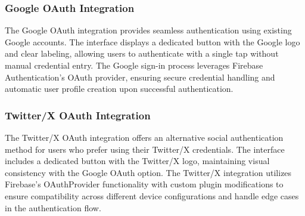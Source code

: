 \subsubsection{Google OAuth Integration}

The Google OAuth integration provides seamless authentication using existing Google accounts. The interface displays a dedicated button with the Google logo and clear labeling, allowing users to authenticate with a single tap without manual credential entry. The Google sign-in process leverages Firebase Authentication's OAuth provider, ensuring secure credential handling and automatic user profile creation upon successful authentication.

\subsubsection{Twitter/X OAuth Integration}

The Twitter/X OAuth integration offers an alternative social authentication method for users who prefer using their Twitter/X credentials. The interface includes a dedicated button with the Twitter/X logo, maintaining visual consistency with the Google OAuth option. The Twitter/X integration utilizes Firebase's OAuthProvider functionality with custom plugin modifications to ensure compatibility across different device configurations and handle edge cases in the authentication flow.

